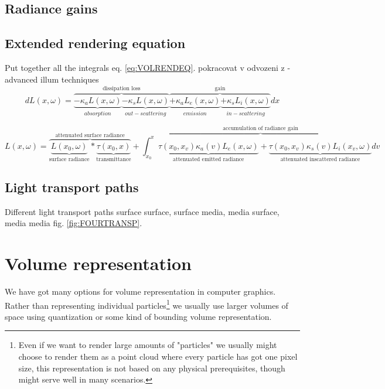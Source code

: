 \subsection{Radiance gains}


\subsection{Extended rendering equation}
Put together all the integrals eq. \ref{eq:VOLRENDEQ}.
pokracovat v odvozeni z -advanced illum techniques
\begin{equation}
\label{eq:VOLRENDEQ}
dL(x,\omega)=\overbrace{\underbrace{{-\kappa_{a}L(x,\omega)} }_{absorption}\underbrace{-\kappa_{s}L(x,\omega)} _{out-scattering} }^\text{dissipation loss}\overbrace{\underbrace{{+\kappa_{a}L_{e}(x,\omega)} }_{emission}\underbrace{+\kappa_{s}L_{i}(x,\omega)} _{in-scattering} }^\text{gain}dx
 \end{equation}
 
 \begin{equation}
 \label{eq:EXTINTFORM}
 L(x,\omega)=\overbrace{\underbrace{L(x_{0},\omega)}_{\text{surface radiance}}*\underbrace{\tau(x_{0},x) }_{\text{transmittance}}}^{\text{attenuated surface radiance}}+
\overbrace{
  \int_{x_{0}}^{x}
    \underbrace{
      \tau(x_{0},x_{v})\kappa_{a}(v)L_{e}(x,\omega)
     }_{\text{attenuated emitted radiance}}
    +
    \underbrace{
       \tau(x_{0},x_{v})\kappa_{s}(v)L_{i}(x_{v},\omega)
    }_{\text{attenuated inscattered radiance}}
    dv
}^{\text{accumulation of radiance gain}}
 \end{equation} 
 
\subsection{Light transport paths}
Different light transport paths surface surface, surface media, media surface, media media fig. \ref{fig:FOURTRANSP}.


\clearpage{}
\section{Volume representation}
We have got many options for volume representation in computer graphics. Rather than representing individual particles\footnote{Even if we want to render large amounts of "particles" we usually might choose to render them as a point cloud where every particle has got one pixel size, this representation is not based on any physical prerequisites, though might serve well in many scenarios.} we usually use larger volumes of space using quantization or some kind of bounding volume representation.

